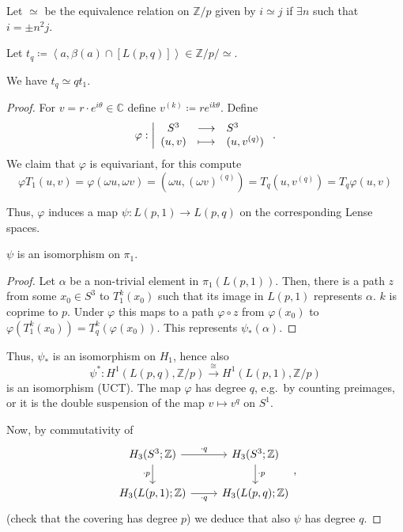 
Let $\simeq$ be the equivalence relation on $\mathbb{Z}/p$ given by
$i \simeq j$ if $\exists n$ such that $i = \pm n^2 j$.

Let $t_q \coloneqq \left< a, β(a) \cap [L(p,q)] \right> \in \mathbb{Z}/p / \simeq$.

\begin{lemma}
  We have $t_q \simeq q t_1$.
\end{lemma}

\begin{proof}
  For $v = r\cdot e^{i\theta} \in \mathbb{C}$ define
  $v^{(k)} \coloneqq re^{ik\theta}$.
  Define
    \begin{equation*}
    \varphi : \left| \begin{array}{c c l} 
    S^3 & \longrightarrow & S^3 \\
    (u,v) & \longmapsto &  (u, v^{(q)})
    \end{array} \right.
    .
  \end{equation*}
  We claim that $\varphi $ is equivariant, for this compute
  \[
    \varphi T_1(u,v) = \varphi(\omega u, \omega v)
    =
    (\omega u, (\omega v)^{(q)})
    =
    T_q(u, v^{(q)})
    =
    T_q \varphi (u,v)
  \]

  Thus, $\varphi$ induces a map $\psi \colon  L(p,1) \to L(p,q)$
  on the corresponding Lense spaces.

  \begin{claim}
    $\psi $ is an isomorphism on $\pi_1$.
  \end{claim}
  \begin{proof}
    Let $α$ be a non-trivial element in $\pi_1(L(p,1))$.
    Then, there is a path $z$ from some $x_0\in S^3$ to
    $T_1^k(x_0)$ such that its image in $L(p,1)$
    represents $α$.
    $k$ is coprime to $p$.
    Under $\varphi $ this maps to a path $\varphi \circ z$
    from $\varphi (x_0)$ to $\varphi (T_1^k(x_0)) = T_q^k(\varphi (x_0))$.
    This represents $\psi _*(α)$.
  \end{proof}
  Thus, $\psi _*$ is an isomorphism on $H_1$,
  hence also
  \[
    \psi ^* \colon  H^1(L(p,q), \mathbb{Z}/p)
    \xrightarrow{\cong}
    H^1(L(p,1), \mathbb{Z}/p)
  \]
  is an isomorphism (UCT).
  The map $\varphi  $ has degree $q$,
  e.g.~by counting preimages, or it is the double suspension
  of the map $v \mapsto v^q$ on $S^1$.

  Now, by commutativity of
  \[
    \begin{tikzcd}
      H_3(S^3; \mathbb{Z})
      \ar[swap]{d}{\cdot p}
      \ar{r}{\cdot q}
      &
      H_3(S^3 ; \mathbb{Z})
      \ar{d}{\cdot p}
      \\
      H_3(L(p,1);\mathbb{Z})
      \ar[swap]{r}{\cdot q}
      &
      H_3(L(p,q);\mathbb{Z})
    \end{tikzcd}
    ,
  \]
  (check that the covering has degree $p$)
  we deduce that also $\psi $ has degree $q$.


\end{proof}
